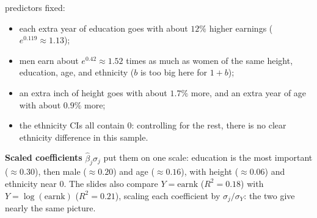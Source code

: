 \documentclass[11pt]{article}
\begin{document}
predictors fixed:
\begin{itemize}[leftmargin=*,itemsep=1pt]
\item each extra year of education goes with about $12\%$ higher earnings ($e^{0.119}\approx1.13$);
\item men earn about $e^{0.42}\approx1.52$ times as much as women of the same height, education, age, and ethnicity ($b$ is too big here for $1+b$);
\item an extra inch of height goes with about $1.7\%$ more, and an extra year of age with about $0.9\%$ more;
\item the ethnicity CIs all contain 0: controlling for the rest, there is no clear ethnicity difference in this sample.
\end{itemize}
\textbf{Scaled coefficients} $\hat\beta_j\sigma_j$ put them on one scale: education is the most important ($\approx0.30$), then male ($\approx0.20$)
and age ($\approx0.16$), with height ($\approx0.06$) and ethnicity near 0. The slides also compare $Y=\text{earnk}$ ($R^2=0.18$) with
$Y=\log(\text{earnk})$ ($R^2=0.21$), scaling each coefficient by $\sigma_j/\sigma_Y$: the two give nearly the same picture.
\end{document}
